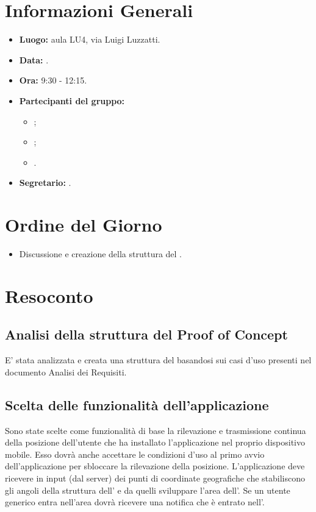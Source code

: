 \section{Informazioni Generali}
\begin{itemize}
\item \textbf{Luogo:} aula LU4, via Luigi Luzzatti.
\item \textbf{Data:} \Data.
\item \textbf{Ora:} 9:30 - 12:15.
\item \textbf{Partecipanti del gruppo:}
	\begin{itemize}
		\item \DF{};
		\item \MC{};
		\item \SE{}.
	\end{itemize} 
\item \textbf{Segretario:} \MC{}.
\end{itemize}

\section{Ordine del Giorno}
\begin{itemize}
	\item Discussione e creazione della struttura del .
\end{itemize}


\section{Resoconto}
\subsection{Analisi della struttura del Proof of Concept}
E' stata analizzata e creata una struttura del  basandosi sui casi d'uso presenti nel documento Analisi dei Requisiti.

\subsection{Scelta delle funzionalità dell'applicazione}
Sono state scelte come funzionalità di base la rilevazione e trasmissione continua della posizione dell'utente che ha installato l'applicazione nel proprio dispositivo mobile. 
Esso dovrà anche accettare le condizioni d'uso al primo avvio dell'applicazione per sbloccare la rilevazione della posizione. L'applicazione deve ricevere in input (dal server) 
dei punti di coordinate geografiche che stabiliscono gli angoli della struttura dell' e da quelli sviluppare l'area dell'.
Se un utente generico entra nell'area dovrà ricevere una notifica che è entrato nell'.

\clearpage